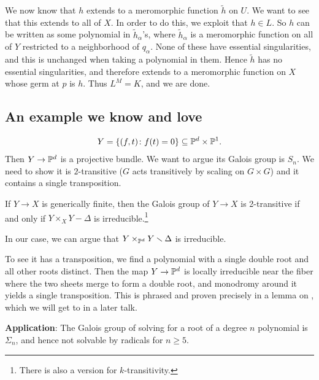 \documentclass[11pt]{amsart}
\let\til\widetilde
\begin{document}
We now know that $h$ extends to a meromorphic function $\til{h}$ on $U$. We want to see that this extends to all of $X$. In order to do this, we exploit that $h \in L$. So $h$ can be written as some polynomial in $\til{h}_\alpha$'s, where $\til{h}_\alpha$ is a meromorphic function on all of $Y$ restricted to a neighborhood of $q_\alpha$. None of these have essential singularities, and this is unchanged when taking a polynomial in them. Hence $\til{h}$ has no essential singularities, and therefore extends to a meromorphic function on $X$ whose germ at $p$ is $h$. Thus $L^M = K$, and we are done.

\subsection{An example we know and love}


\begin{align*}
    Y = \left\{ (f,t) \colon f(t) = 0 \right\} \subseteq \P^d \times \P^1.
\end{align*}
Then $Y \to \P^d$ is a projective bundle. We want to argue its Galois group is $S_n$. We need to show it is $2$-transitive ($G$ acts transitively by scaling on $G \times G$) and it contains a single transposition.

\begin{proposition} If $Y \to X$ is generically finite, then the Galois group of $Y \to X$ is 2-transitive if and only if $Y \times_X Y \minus \Delta$ is irreducible.\footnote{There is also a version for $k$-transitivity.} 
\end{proposition}

In our case, we can argue that $Y \times_{\P^d} Y\minus\Delta$ is irreducible.

To see it has a transposition, we find a polynomial with a single double root and all other roots distinct. Then the map $Y \to \P^d$ is locally irreducible near the fiber where the two sheets merge to form a double root, and monodromy around it yields a single transposition. This is phrased and proven precisely in a lemma on \cite[p.~698]{Harris-Galois}, which we will get to in a later talk.

\textbf{Application}: The Galois group of solving for a root of a degree $n$ polynomial is $\Sigma_n$, and hence not solvable by radicals for $n\ge 5$.



\printbibliography
\end{document}
